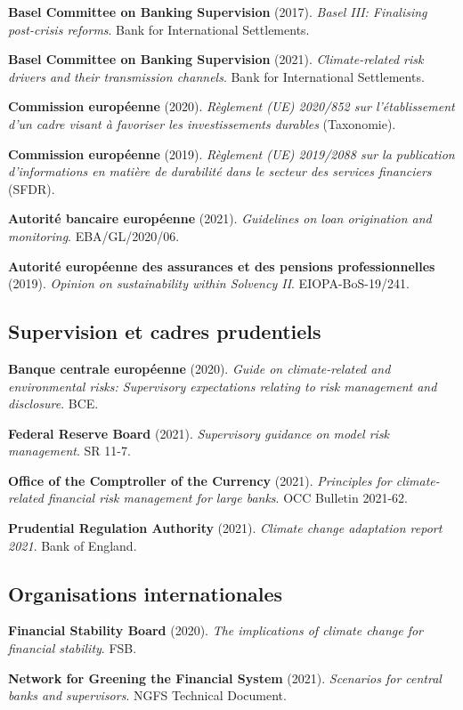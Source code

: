\textbf{Basel Committee on Banking Supervision} (2017). \textit{Basel III: Finalising post-crisis reforms}. Bank for International Settlements.

\textbf{Basel Committee on Banking Supervision} (2021). \textit{Climate-related risk drivers and their transmission channels}. Bank for International Settlements.

\textbf{Commission européenne} (2020). \textit{Règlement (UE) 2020/852 sur l'établissement d'un cadre visant à favoriser les investissements durables} (Taxonomie).

\textbf{Commission européenne} (2019). \textit{Règlement (UE) 2019/2088 sur la publication d'informations en matière de durabilité dans le secteur des services financiers} (SFDR).

\textbf{Autorité bancaire européenne} (2021). \textit{Guidelines on loan origination and monitoring}. EBA/GL/2020/06.

\textbf{Autorité européenne des assurances et des pensions professionnelles} (2019). \textit{Opinion on sustainability within Solvency II}. EIOPA-BoS-19/241.

\subsection{Supervision et cadres prudentiels}

\textbf{Banque centrale européenne} (2020). \textit{Guide on climate-related and environmental risks: Supervisory expectations relating to risk management and disclosure}. BCE.

\textbf{Federal Reserve Board} (2021). \textit{Supervisory guidance on model risk management}. SR 11-7.

\textbf{Office of the Comptroller of the Currency} (2021). \textit{Principles for climate-related financial risk management for large banks}. OCC Bulletin 2021-62.

\textbf{Prudential Regulation Authority} (2021). \textit{Climate change adaptation report 2021}. Bank of England.

\subsection{Organisations internationales}

\textbf{Financial Stability Board} (2020). \textit{The implications of climate change for financial stability}. FSB.

\textbf{Network for Greening the Financial System} (2021). \textit{Scenarios for central banks and supervisors}. NGFS Technical Document.

